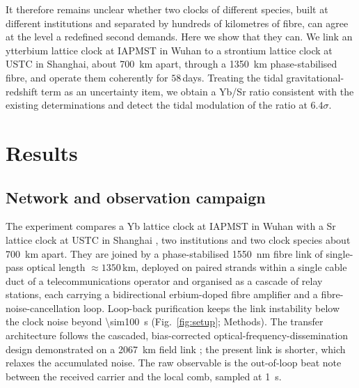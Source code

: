 \documentclass[11pt,a4paper]{article}
\begin{document}
It therefore remains unclear whether two clocks of different species,
built at different institutions and separated by hundreds of kilometres
of fibre, can agree at the level a redefined second demands. Here we
show that they can. We link an ytterbium lattice clock at IAPMST in
Wuhan to a strontium lattice clock at USTC in Shanghai, about
\qty{700}{km} apart, through a \qty{1350}{km} phase-stabilised fibre, and
operate them coherently for $58$\,days. Treating the tidal
gravitational-redshift term as an uncertainty item, we obtain a Yb/Sr
ratio consistent with the existing determinations and detect the tidal
modulation of the ratio at $6.4\sigma$.



\section{Results}

\subsection{Network and observation campaign}
\label{sec:network}

The experiment compares a Yb lattice clock at IAPMST in Wuhan
\citep{zhu2026yb} with a Sr lattice clock at USTC in Shanghai
\citep{jia2026sr}, two institutions and two clock
species about \qty{700}{km} apart. They are joined by a phase-stabilised
\qty{1550}{nm} fibre link of single-pass optical length $\approx1350$\,km,
deployed on paired strands within a single cable duct of a
telecommunications operator and organised as a cascade of relay stations,
each carrying a bidirectional erbium-doped fibre amplifier and a
fibre-noise-cancellation loop. Loop-back purification keeps the link
instability below the clock noise beyond \qty{\sim100}{s}
(Fig.~\ref{fig:setup}; Methods). The transfer architecture follows the
cascaded, bias-corrected optical-frequency-dissemination design
demonstrated on a \qty{2067}{km} field link \citep{chen2026dissemination}; the
present link is shorter, which relaxes the accumulated noise. The raw
observable is the out-of-loop beat note between the received carrier and
the local comb, sampled at \qty{1}{s}.
\end{document}
